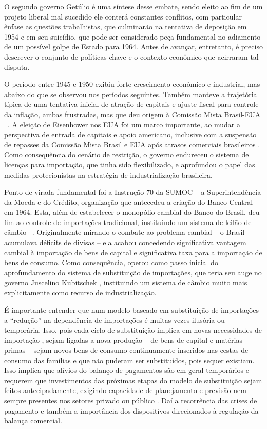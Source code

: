 O segundo governo Getúlio é uma síntese desse embate, sendo eleito ao
fim de um projeto liberal mal sucedido ele conterá constantes conflitos,
com particular ênfase as questões trabalhistas, que culminarão na
tentativa de deposição em 1954 e em seu suicídio, que pode ser
considerado peça fundamental no adiamento de um possível golpe de Estado
para 1964. Antes de avançar, entretanto, é preciso descrever o conjunto
de políticas chave e o contexto econômico que acirraram tal disputa.

O período entre 1945 e 1950 exibiu forte crescimento econômico
e industrial, mas abaixo do que se observou nos períodos seguintes.
Também manteve a trajetória típica de uma tentativa inicial de atração
de capitais e ajuste fiscal para controle da inflação, ambas frustradas,
mas que deu origem à Comissão Mista Brasil-EUA ~\citep{vianna_o_2025}. A
eleição de Eisenhower nos EUA foi um marco importante, ao mudar a
perspectiva de entrada de capitais e apoio americano, inclusive com a
suspensão de repasses da Comissão Mista Brasil e EUA após atrasos
comerciais brasileiros \citep{vianna_o_2025}. Como consequência do cenário de
restrição, o governo endureceu o sistema de licenças para importação,
que tinha sido flexibilizado, e aprofundou o papel das medidas
protecionistas na estratégia de industrialização brasileira.

Ponto de virada fundamental foi a Instrução 70 da SUMOC -- a
Superintendência da Moeda e do Crédito, organização que antecedeu a
criação do Banco Central em 1964. Esta, além de estabelecer o monopólio
cambial do Banco do Brasil, deu fim ao controle de importações
tradicional, instituindo um sistema de leilão de câmbio ~\citep{vianna_o_2025}.
Originalmente mirando o combate ao problema cambial -- o Brasil
acumulava déficits de divisas -- ela acabou concedendo significativa
vantagem cambial à importação de bens de capital e significativa taxa
para a importação de bens de consumo. Como consequência, operou como
passo inicial do aprofundamento do sistema de substituição de
importações, que teria seu auge no governo Juscelino Kubitschek
\citep{tavares_da_1973}, instituindo um sistema de câmbio muito mais
explicitamente como recurso de industrialização.

É importante entender que num modelo baseado em substituição de
importações a ``redução'' na dependência de importações é muitas vezes
ilusória ou temporária. Isso, pois cada ciclo de substituição implica em
novas necessidades de importação \citep{tavares_da_1973}, sejam ligadas a nova
produção -- de bens de capital e matérias-primas -- sejam novos bens de
consumo continuamente inseridos nas cestas de consumo das famílias e que
não puderam ser substituídos, pois sequer existiam. Isso implica que
alívios do balanço de pagamentos são em geral temporários e requerem que
investimentos das próximas etapas do modelo de substituição sejam feitos
antecipadamente, exigindo capacidade de planejamento e previsão nem
sempre presentes nos setores privado ou público \citep{tavares_da_1973}. Daí a
recorrência das crises de pagamento e também a importância dos
dispositivos direcionados à regulação da balança comercial.

